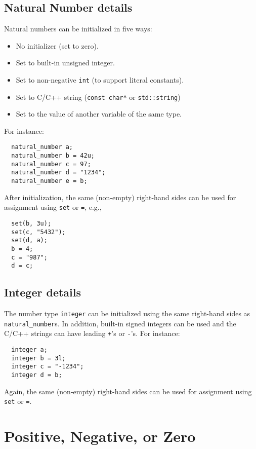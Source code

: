 \documentclass[a4paper]{article}
\begin{document}
\subsection{Natural Number details}

Natural numbers can be initialized in five ways:
\begin{itemize}
\item No initializer (set to zero).
\item Set to built-in unsigned integer.
\item Set to non-negative \texttt{int} (to support literal constants).
\item Set to C/C++ string (\texttt{const char*} or \texttt{std::string})
\item Set to the value of another variable of the same type.
\end{itemize}

For instance:
\begin{verbatim}
  natural_number a;
  natural_number b = 42u;
  natural_number c = 97;
  natural_number d = "1234";
  natural_number e = b;
\end{verbatim}

After initialization, the same (non-empty) right-hand sides can be used for assignment using \texttt{set} or \texttt{=}, e.g.,
\begin{verbatim}
  set(b, 3u);
  set(c, "5432");
  set(d, a);
  b = 4;
  c = "987";
  d = c;
\end{verbatim}

\subsection{Integer details}

The number type \texttt{integer} can be initialized using the same right-hand sides as \texttt{natural\_number}s. In addition, built-in signed integers can be used and the C/C++ strings can have leading \texttt{+}'s or \texttt{-}'s. For instance:
\begin{verbatim}
  integer a;
  integer b = 3l;
  integer c = "-1234";
  integer d = b;
\end{verbatim}
Again, the same (non-empty) right-hand sides can be used for assignment using \texttt{set} or \texttt{=}.


\section{Positive, Negative, or Zero}
\end{document}

